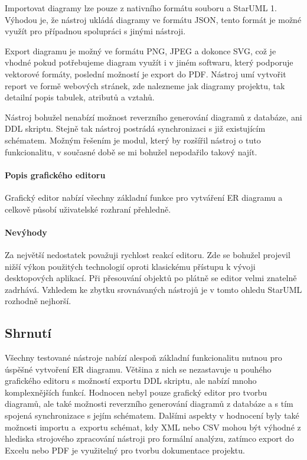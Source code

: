 \documentclass[czech,bachelor,public,dept460,male,oneside]{diploma}
\begin{document}
		Importovat diagramy lze pouze z nativního formátu souboru a StarUML 1. Výhodou je, že nástroj ukládá diagramy ve formátu JSON, tento formát je možné využít pro případnou spolupráci s jinými nástroji.
		
		Export diagramu je možný ve formátu PNG, JPEG a dokonce SVG, což je vhodné pokud potřebujeme diagram využít i v jiném softwaru, který podporuje vektorové formáty, poslední možností je export do PDF. Nástroj umí vytvořit report ve formě webových stránek, zde nalezneme jak diagramy projektu, tak detailní popis tabulek, atributů a vztahů. 
		
		Nástroj bohužel nenabízí možnost reverzního generování diagramů z databáze, ani DDL skriptu. Stejně tak nástroj postrádá synchronizaci s již existujícím schématem. Možným řešením je modul, který by rozšířil nástroj o tuto funkcionalitu, v současné době se mi bohužel nepodařilo takový najít.
		\paragraph{Popis grafického editoru}
		Grafický editor nabízí všechny základní funkce pro vytváření ER diagramu a celkově působí uživatelské rozhraní přehledně. 
		
		\paragraph{Nevýhody}
		Za největší nedostatek považuji rychlost reakcí editoru. Zde se bohužel projevil nižší výkon použitých technologií oproti klasickému přístupu k vývoji desktopových aplikací. Při přesouvání objektů po plátně se editor velmi znatelně zadrhává. Vzhledem ke zbytku srovnávaných nástrojů je v tomto ohledu StarUML rozhodně nejhorší.
	
	\subsection{Shrnutí}
	Všechny testované nástroje nabízí alespoň základní funkcionalitu nutnou pro úspěšné vytvoření ER diagramu. Většina z nich se nezastavuje u pouhého grafického editoru s možností exportu DDL skriptu, ale nabízí mnoho komplexnějších funkcí. Hodnocen nebyl pouze grafický editor pro tvorbu diagramů, ale také možnosti reverzního generování diagramů z databáze a s tím spojená synchronizace s jejím schématem. Dalšími aspekty v hodnocení byly také možnosti importu a~exportu schémat, kdy XML nebo CSV mohou být výhodné z hlediska strojového zpracování nástroji pro formální analýzu, zatímco export do Excelu nebo PDF je využitelný pro tvorbu dokumentace projektu.
	
\end{document}
